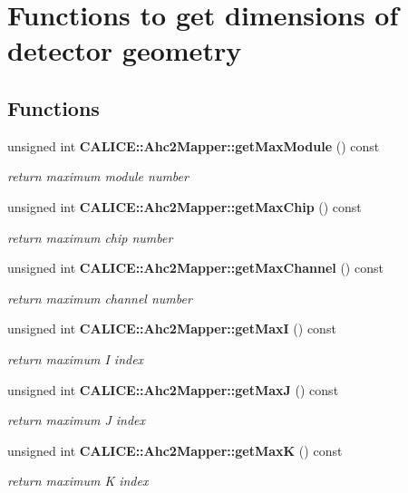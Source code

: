 \section{Functions to get dimensions of detector geometry}
\label{group__Range}
\subsection*{Functions}
\begin{DoxyCompactItemize}
\item 
unsigned int {\bf C\-A\-L\-I\-C\-E\-::\-Ahc2\-Mapper\-::get\-Max\-Module} () const 
\begin{DoxyCompactList}\small\item\em return maximum module number \end{DoxyCompactList}\item 
unsigned int {\bf C\-A\-L\-I\-C\-E\-::\-Ahc2\-Mapper\-::get\-Max\-Chip} () const 
\begin{DoxyCompactList}\small\item\em return maximum chip number \end{DoxyCompactList}\item 
unsigned int {\bf C\-A\-L\-I\-C\-E\-::\-Ahc2\-Mapper\-::get\-Max\-Channel} () const 
\begin{DoxyCompactList}\small\item\em return maximum channel number \end{DoxyCompactList}\item 
unsigned int {\bf C\-A\-L\-I\-C\-E\-::\-Ahc2\-Mapper\-::get\-Max\-I} () const 
\begin{DoxyCompactList}\small\item\em return maximum I index \end{DoxyCompactList}\item 
unsigned int {\bf C\-A\-L\-I\-C\-E\-::\-Ahc2\-Mapper\-::get\-Max\-J} () const 
\begin{DoxyCompactList}\small\item\em return maximum J index \end{DoxyCompactList}\item 
unsigned int {\bf C\-A\-L\-I\-C\-E\-::\-Ahc2\-Mapper\-::get\-Max\-K} () const 
\begin{DoxyCompactList}\small\item\em return maximum K index \end{DoxyCompactList}\item 

\end{DoxyCompactItemize}
